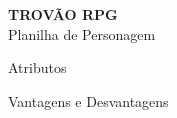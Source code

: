 \documentclass[a4paper]{article}
\begin{document}
	\centering \large \textbf{ TROV\~{A}O RPG} \\
    \normalsize \centering Planilha de Personagem \\
    
	\begin{minipage}[t][][t]{.5\linewidth}
	   	\centering Atributos	
	\end{minipage}%
	\begin{minipage}[t][][t]{.5\linewidth}
		\centering Vantagens e Desvantagens
	\end{minipage}
\end{document}
